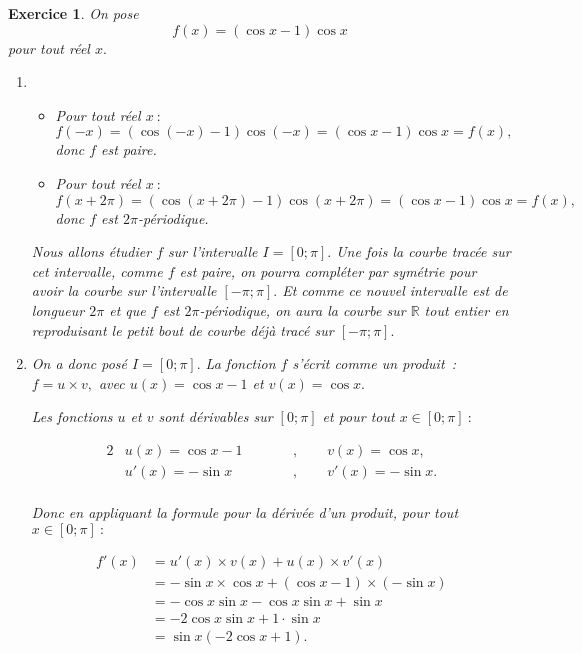 \documentclass[10pt]{article}
\newtheorem{exo}{Exercice}
\begin{document}
\begin{exo}


On pose \[f(x)=\left(\cos x-1\right)\cos x\] pour tout réel $x.$

\begin{enumerate}
\item \begin{itemize}
\item[\textbullet] Pour tout réel $x~:$
\[f(-x)=\left(\cos (-x)-1\right)\cos (-x)=\left(\cos x-1\right)\cos x=f(x),\] donc $f$ est paire.
\item[\textbullet]  Pour tout réel $x~:$
\[f(x+2\pi)=\left(\cos (x+2\pi)-1\right)\cos (x+2\pi)=\left(\cos x-1\right)\cos x=f(x),\]
donc $f$ est $2\pi$-périodique.
\end{itemize}

\medskip

Nous allons étudier $f$ sur l'intervalle $I=\left[0;\pi\right].$ Une fois la courbe tracée sur cet intervalle, comme $f$ est paire, on pourra compléter par symétrie pour avoir la courbe sur l'intervalle $\left[-\pi;\pi\right].$ Et comme ce nouvel intervalle est de longueur $2\pi$ et que $f$ est $2\pi$-périodique, on aura la courbe sur $\mathbb{R}$ tout entier en reproduisant le petit bout de courbe déjà tracé sur $\left[-\pi;\pi\right].$

\item On a donc posé $I=\left[0;\pi\right].$ La fonction $f$ s'écrit comme un produit~: $f=u\times v,$ avec $u(x)=\cos x-1$ et $v(x)=\cos x.$

Les fonctions $u$ et $v$ sont dérivables sur $\left[0;\pi\right]$ et pour tout $x\in\left[0;\pi\right]~:$


\begin{alignat*}{2}
&u(x)=\cos x-1\qquad && , \qquad v(x)=\cos x,\\
&u'(x)=-\sin x \qquad && , \qquad v'(x)=-\sin x.\\
\end{alignat*}





Donc en appliquant la formule pour la dérivée d'un produit, pour tout $x\in\left[0;\pi\right]~:$


\begin{align*}f'(x)&=u'(x)\times v(x)+u(x)\times v'(x)\\
&=-\sin x\times \cos x+(\cos x-1)\times (-\sin x)\\
&=-\cos x\sin x-\cos x\sin x+\sin x\\
&=-2\cos x\sin x+1\cdot\sin x\\
&=\sin x(-2\cos x+1).
\end{align*}



\end{enumerate}
\end{exo}
\end{document}
